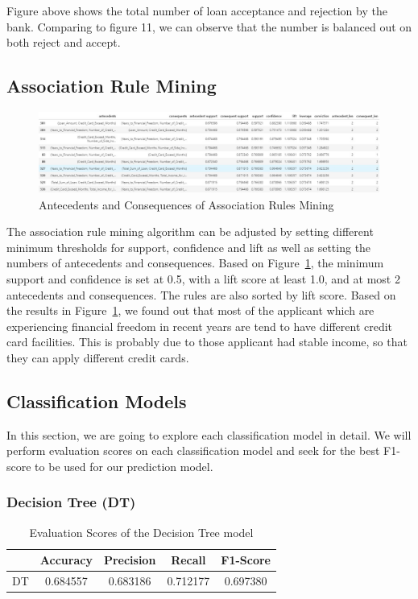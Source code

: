 \documentclass[11pt]{article}
\begin{document}
Figure above shows the total number of loan acceptance and rejection by the bank. Comparing to figure 11, we can observe that the number is balanced out on both reject and accept.
\clearpage



\subsection{Association Rule Mining}
\begin{figure}[h]
\centerline{\includegraphics[scale=0.35]{armResults.jpeg}}
\caption{Antecedents and Consequences of Association Rules Mining}
\label{fig:armResults}
\end{figure}

The association rule mining algorithm can be adjusted by setting different minimum thresholds for support, confidence and lift as well as setting the numbers of antecedents and consequences. Based on Figure~\ref{fig:armResults}, the minimum support and confidence is set at 0.5, with a lift score at least 1.0, and at most 2 antecedents and consequences. The rules are also sorted by lift score. Based on the results in Figure~\ref{fig:armResults},  we found out that most of the applicant which are experiencing financial freedom in recent years are tend to have different credit card facilities. This is probably due to those applicant had stable income, so that they can apply different credit cards. 

\subsection{Classification Models}
In this section, we are going to explore each classification model in detail. We will perform evaluation scores on each classification model and seek for the best F1-score to be used for our prediction model.

\clearpage
\subsubsection{Decision Tree (DT)}
\begin{table}[ht]
\centering
\caption{\label{tab:dtMetrics}Evaluation Scores of the Decision Tree model}
\begin{adjustbox}{width=0.7\textwidth}
\begin{tabular}{|c|c|c|c|c|}
\hline
\textbf{} & \textbf{Accuracy} & \textbf{Precision} & \textbf{Recall} & \textbf{F1-Score} \\ \hline
DT        & 0.684557          & 0.683186           & 0.712177        & 0.697380          \\ \hline
\end{tabular}
\end{adjustbox}
\end{table}
\end{document}
